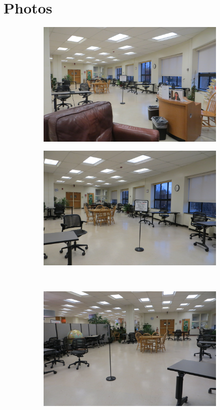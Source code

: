 \documentclass[12pt]{article} %
\begin{document}
\section{Photos} %
  \begin{figure}[H]
  \begin{subfigure}{.5\linewidth}
  \centering
  \includegraphics[width=0.75\linewidth]{WC1}
  \caption{}
  \label{fig:WC1}
  \end{subfigure}%
  \begin{subfigure}{.5\linewidth}
  \centering
  \includegraphics[width=0.75\linewidth]{WC2}
  \caption{}
  \label{fig:WC2}
  \end{subfigure}\\[1ex]
  \begin{subfigure}{.5\linewidth}
  \centering
  \includegraphics[width=0.75\linewidth]{WC3}

\end{subfigure}
\end{figure}
\end{document}
